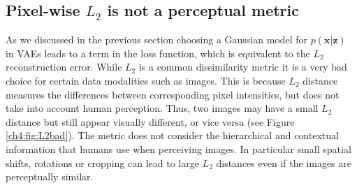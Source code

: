 \subsection{Pixel-wise $L_2$ is not a perceptual metric}
\label{ch4:sec:_l2}
As we discussed in the previous section choosing a Gaussian model for $ p(\textbf{x} | \textbf{z}) $ in VAEs leads to a term in the loss function, which is equivalent to the $L_2$ reconstruction error. While $L_2$ is a common dissimilarity metric it is a very bad choice for certain data modalities such as images. This is because $L_2$ distance measures the differences between corresponding pixel intensities, but does not take into account human perception. Thus, two images may have a small $L_2$ distance but still appear visually different, or vice versa (see Figure \ref{ch4:fig:L2bad}). The metric does not consider the hierarchical and contextual information that humans use when perceiving images. In particular small spatial shifts, rotations or cropping can lead to large $L_2$ distances even if the images are perceptually similar.


